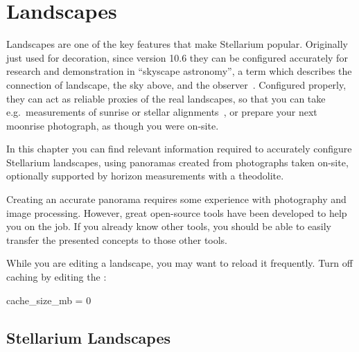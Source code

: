 

\chapter{Landscapes}
\label{ch:landscapes}

\newcommand{\landscape}[1]{\textsf{\textit{\footnotesize #1}}}


Landscapes are one of the key features that make Stellarium popular.
Originally just used for decoration, since version 10.6 they can be
configured accurately for research and demonstration in ``skyscape
astronomy'', a term which describes the connection of landscape,
the sky above, and the observer~\citep{Brown:JSA2015}. Configured properly, they can act as reliable proxies
of the real landscapes, so that you can take e.g.\ measurements of
sunrise or stellar alignments~\citep{Zotti-Neubauer:SEAC2011}, or prepare your next moonrise
photograph, as though you were on-site.

In this chapter you can find relevant information required to
accurately configure Stellarium landscapes, using panoramas created
from photographs taken on-site, optionally supported by horizon
measurements with a theodolite.


Creating an accurate panorama requires some experience with
photography and image processing. However, great open-source tools
have been developed to help you on the job. If you already know other
tools, you should be able to easily transfer the presented concepts to
those other tools.

While you are editing a landscape, you may want to reload it
frequently. Turn off caching by editing the :

\begin{configfile}
  [landscape]
  cache_size_mb = 0
\end{configfile}

\section{Stellarium Landscapes}
\label{sec:landscapes:StellariumLandscapes}


